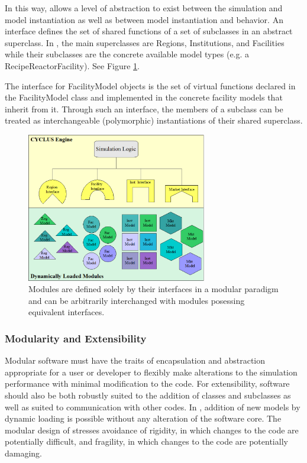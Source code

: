 In this way, \Cyclus allows a level of abstraction to exist between the 
simulation and model instantiation as well as between model instantiation and 
behavior.  An interface defines the set of shared functions of a set of 
subclasses in an abstract superclass. In \Cyclus, the main superclasses are 
Regions, Institutions, and Facilities while their subclasses are the concrete 
available model types (e.g. a RecipeReactorFacility). See Figure 
\ref{fig:modularity}.

The interface for FacilityModel objects is the set of 
virtual functions declared in the FacilityModel class and implemented in the 
concrete facility models that inherit from it. Through 
such an interface, the members of a subclass can be treated as 
interchangeable (polymorphic) instantiations of their shared 
superclass. 

\begin{figure}[htb!]
  \begin{center}
    \includegraphics[width=0.7\textwidth]{./chapters/paradigm/modularity.png}
  \end{center}
  \caption[Module Interfaces and Encapsulation in \Cyclus.]{Modules are defined solely 
  by their interfaces in a modular paradigm and can be arbitrarily 
  interchanged with modules posessing equivalent interfaces.}
  \label{fig:modularity}
\end{figure}


\subsubsection{Modularity and Extensibility}

Modular software must have the traits of encapsulation and abstraction 
appropriate for a user or developer to flexibly make alterations to 
the simulation performance with minimal modification to the code. For 
extensibility, software should also be both robustly suited to the addition of 
classes and subclasses as well as suited to communication with other codes.
In \Cyclus, addition of new models by dynamic loading is possible without 
any alteration of the software core. The modular design of \Cyclus stresses
avoidance of rigidity, in which changes to the code are potentially difficult, 
and fragility, in which changes to the code are potentially damaging.


